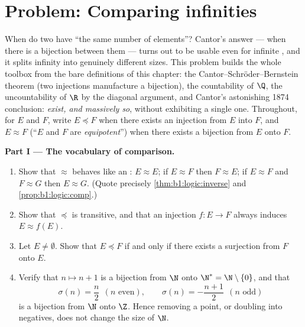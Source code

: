 \section{Problem: Comparing infinities}

\begin{problem}\label{pb:b1:logic:1}
When do two  have ``the same number of elements''? Cantor's
answer --- when there is a bijection between them --- turns out to be
usable even for infinite , and it splits infinity into genuinely
different sizes. This problem builds the whole toolbox from the bare
definitions of this chapter: the Cantor--Schr\"oder--Bernstein theorem
(two injections manufacture a bijection), the countability of $\Q$,
the uncountability of $\R$ by the diagonal argument, and Cantor's
astonishing 1874 conclusion: \emph{ exist, and
massively so}, without exhibiting a single one.
Throughout, for  $E$ and $F$, write $E \preceq F$ when there
exists an injection from $E$ into $F$, and $E \approx F$ (``$E$ and
$F$ are \emph{equipotent}'') when there exists a bijection from $E$
onto $F$.

\medskip
\noindent\textbf{Part I --- The vocabulary of comparison.}
\begin{enumerate}
  \item Show that $\approx$ behaves like an :
        $E \approx E$; if $E \approx F$ then $F \approx E$; if
        $E \approx F$ and $F \approx G$ then $E \approx G$. (Quote
        precisely \cref{thm:b1:logic:inverse} and
        \cref{prop:b1:logic:comp}.)
  \item Show that $\preceq$ is transitive, and that an injection
        $f \colon E \to F$ always induces $E \approx f(E)$.
  \item Let $E \neq \emptyset$. Show that $E \preceq F$ if and only
        if there exists a surjection from $F$ onto $E$.
  \item Verify that $n \mapsto n + 1$ is a bijection from $\N$ onto
        $\N^* = \N \setminus \{0\}$, and that
        \[
        \sigma(n) = \frac n2 \ \ (n \text{ even}), \qquad
        \sigma(n) = -\frac{n+1}2 \ \ (n \text{ odd})
        \]
        is a bijection from $\N$ onto $\Z$. Hence removing a point,
        or doubling into negatives, does not change the size of
        $\N$.
\end{enumerate}


\end{problem}
